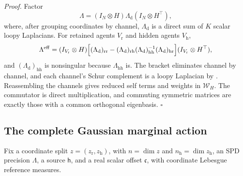 \noindent\emph{Proof.}
Factor
\begin{equation}
\Lambda=(I_N\otimes H)\Lambda_{\mathrm d}(I_N\otimes H^\top),
\label{eq:cg-kron-congruence-factor}
\end{equation}
where, after grouping coordinates by channel, \(\Lambda_{\mathrm d}\) is a
direct sum of \(K\) scalar loopy Laplacians. For retained agents
\(V_{\mathrm r}\) and hidden agents \(V_{\mathrm h}\),
\begin{equation}
\Lambda^{\mathrm{eff}}
=(I_{V_{\mathrm r}}\otimes H)\Bigl[
(\Lambda_{\mathrm d})_{\mathrm{rr}}
-(\Lambda_{\mathrm d})_{\mathrm{rh}}(\Lambda_{\mathrm d})_{\mathrm{hh}}^{-1}
(\Lambda_{\mathrm d})_{\mathrm{hr}}
\Bigr](I_{V_{\mathrm r}}\otimes H^\top),
\label{eq:cg-kron-congruence-schur}
\end{equation}
and \((\Lambda_{\mathrm d})_{\mathrm{hh}}\) is nonsingular because
\(\Lambda_{\mathrm{hh}}\) is. The bracket eliminates channel by channel, and
each channel's Schur complement is a loopy Laplacian by
. Reassembling the channels gives reduced self
terms and weights in \(\mathcal W_H\). The commutator is direct multiplication,
and commuting symmetric matrices are exactly those with a common orthogonal
eigenbasis. \(\square\)

\subsection{The complete Gaussian marginal action}
\label{sec:cg-kron-normalized-action}

Fix a coordinate split \(z=(z_{\mathrm r},z_{\mathrm h})\), with \(n=\dim z\)
and \(n_{\mathrm h}=\dim z_{\mathrm h}\), an SPD precision \(\Lambda\), a source
\(\mathsf h\), and a real scalar offset \(\mathfrak c\), with coordinate
Lebesgue reference measures.

